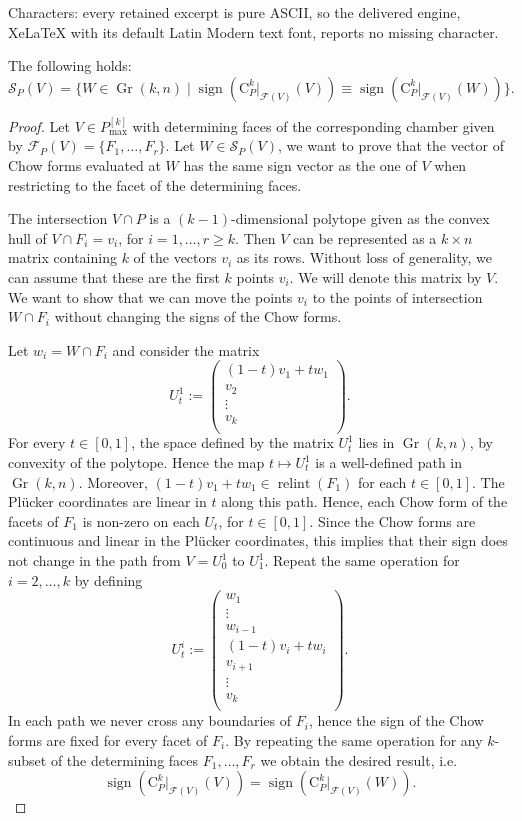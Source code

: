 \documentclass[10pt,a4paper]{amsart}
\DeclareMathOperator{\Gr}{Gr}
\DeclareMathOperator{\relint}{relint}
\DeclareMathOperator{\sign}{sign}
\newcommand{\CPk}{\mathrm{C}_P^k}
\newcommand{\Pkmax}{P^{[k]}_{\max}}
\newcommand{\mF}{\mathcal{F}}
\newcommand{\mS}{\mathcal{S}}
\begin{document}
Characters: every retained excerpt is pure ASCII, so the delivered engine, XeLaTeX with its default Latin Modern text font, reports no missing character.
\begin{thm}\label{thm : sign var}
    The following holds:
    \[ \mS_P(V) = \{ W\in \Gr(k,n) \mid \sign(\CPk|_{\mF(V)}(V)) \equiv \sign(\CPk|_{\mF(V)}(W)) \}. \]
\end{thm}

\begin{proof}
    Let $V\in \Pkmax$ with determining faces of the corresponding chamber given by $\mF_P(V) = \{F_1,\ldots,F_r\}$. 
    Let $W\in \mS_P(V)$, we want to prove that the vector of Chow forms evaluated at $W$ has the same sign vector as the one of $V$ when restricting to the facet of the determining faces.

    The intersection $V\cap P$ is a $(k-1)$-dimensional polytope given as the convex hull of $V\cap F_i = v_i$, for $i=1,\ldots,r\geq k$. Then $V$ can be represented as a $k\times n$ matrix containing $k$ of the vectors $v_i$ as its rows. Without loss of generality, we can assume that these are the first $k$ points $v_i$. We will denote this matrix by $V$. We want to show that we can move the points $v_i$ to the points of intersection $W\cap F_i$ without changing the signs of the Chow forms.

    Let $w_i=W\cap F_i$ and consider the matrix
    \[ U^1_t:=\begin{pmatrix}
    (1-t)v_1 + tw_1 \\
    v_2\\
    \vdots   \\
    v_{k} \\
    \end{pmatrix}. \]
    For every $t\in [0,1]$, the space defined by the matrix $U^1_t$ lies in $\Gr(k,n)$, by convexity of the polytope.
    Hence the map $t \mapsto U^1_t$ is a well-defined path in $\Gr(k,n)$. Moreover, $(1-t)v_1 + tw_1 \in \relint(F_1)$ for each $t\in [0,1]$. The Pl\"ucker coordinates are linear in $t$ along this path. Hence, each Chow form of the facets of $F_1$ is non-zero on each $U_t$, for $t\in[0,1]$. Since the Chow forms are continuous and linear in the Pl\"ucker coordinates, this implies that their sign does not change in the path from $V=U^1_0$ to $U^1_1$. Repeat the same operation for $i=2,\ldots,k$ by defining 
    \[ U^i_t:=\begin{pmatrix}
    w_1 \\
    \vdots\\
    w_{i-1}\\
    (1-t)v_i + tw_i\\
    v_{i+1}\\
    \vdots   \\
    v_{k} \\
    \end{pmatrix}. \]
    In each path we never cross any boundaries of $F_i$, hence the sign of the Chow forms are fixed for every facet of $F_i$. By repeating the same operation for any $k$-subset of the determining faces $F_1,\ldots, F_r$ we obtain the desired result, i.e.
    \[ \sign(\CPk|_{\mF(V)}(V)) = \sign(\CPk|_{\mF(V)}(W)). \]


\end{proof}
\end{document}
